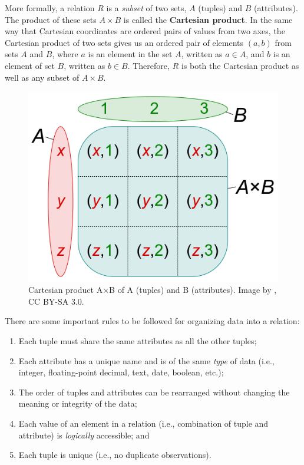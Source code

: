 \documentclass[
]{book}
\providecommand{\tightlist}{%
  \setlength{\itemsep}{0pt}\setlength{\parskip}{0pt}}
\begin{document}
More formally, a relation \(R\) is a \emph{subset} of two sets, \(A\) (tuples) and \(B\) (attributes). The product of these sets \(A×B\) is called the \textbf{Cartesian product}. In the same way that Cartesian coordinates are ordered pairs of values from two axes, the Cartesian product of two sets gives us an ordered pair of elements \((a,b)\) from sets \(A\) and \(B\), where \(a\) is an element in the set \(A\), written as \(a∈A\), and \(b\) is an element of set \(B\), written as \(b∈B\). Therefore, \(R\) is both the Cartesian product as well as any subset of \(A×B\).



\begin{figure}
\includegraphics[width=0.75\linewidth]{images/05-cartesian-product} \caption{Cartesian product A×B of A (tuples) and B (attributes). Image by \citep{quartl_english_2012}, CC BY-SA 3.0.}\label{fig:5-cartesian-product}
\end{figure}

There are some important rules to be followed for organizing data into a relation:

\begin{enumerate}
\def\labelenumi{\arabic{enumi}.}
\tightlist
\item
  Each tuple must share the same attributes as all the other tuples;
\item
  Each attribute has a unique name and is of the same \emph{type} of data (i.e., integer, floating-point decimal, text, date, boolean, etc.);
\item
  The order of tuples and attributes can be rearranged without changing the meaning or integrity of the data;
\item
  Each value of an element in a relation (i.e., combination of tuple and attribute) is \emph{logically} accessible; and
\item
  Each tuple is unique (i.e., no duplicate observations).
\end{enumerate}
\end{document}
